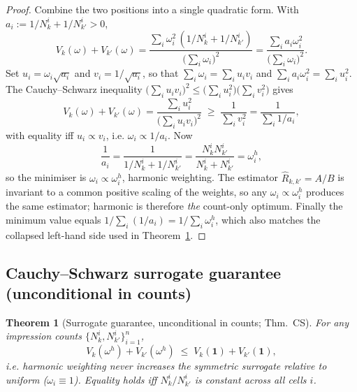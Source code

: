 \documentclass[11pt]{article}
\newtheorem{theorem}{Theorem}
\begin{document}
\begin{proof}
Combine the two positions into a single quadratic form. With
$a_i:=1/N_k^i+1/N_{k'}^i>0$,
\[
V_k(\omega)+V_{k'}(\omega)
=\frac{\sum_i\omega_i^2\,(1/N_k^i+1/N_{k'}^i)}{\bigl(\sum_i\omega_i\bigr)^2}
=\frac{\sum_i a_i\omega_i^2}{\bigl(\sum_i\omega_i\bigr)^2}.
\]
Set $u_i=\omega_i\sqrt{a_i}$ and $v_i=1/\sqrt{a_i}$, so that
$\sum_i\omega_i=\sum_i u_i v_i$ and $\sum_i a_i\omega_i^2=\sum_i u_i^2$.
The Cauchy--Schwarz inequality
$\bigl(\sum_i u_i v_i\bigr)^2\le\bigl(\sum_i u_i^2\bigr)\bigl(\sum_i v_i^2\bigr)$
gives
\[
V_k(\omega)+V_{k'}(\omega)
=\frac{\sum_i u_i^2}{\bigl(\sum_i u_i v_i\bigr)^2}
\;\ge\;\frac{1}{\sum_i v_i^2}
=\frac{1}{\sum_i 1/a_i},
\]
with equality iff $u_i\propto v_i$, i.e. $\omega_i\propto 1/a_i$.
Now
\[
\frac{1}{a_i}=\frac{1}{1/N_k^i+1/N_{k'}^i}
=\frac{N_k^iN_{k'}^i}{N_k^i+N_{k'}^i}=\omega_i^h,
\]
so the minimiser is $\omega_i\propto\omega_i^h$, harmonic weighting.
The estimator $\hat R_{k,k'}=A/B$ is invariant to a common positive
scaling of the weights, so any $\omega_i\propto\omega_i^h$ produces the
same estimator; harmonic is therefore \emph{the} count-only optimum.
Finally the minimum value equals $1/\sum_i(1/a_i)=1/\sum_i\omega_i^h$,
which also matches the collapsed left-hand side used in
Theorem~\ref{sup:thm:cs}.
\end{proof}

\subsection{Cauchy--Schwarz surrogate guarantee (unconditional in counts)}

\begin{theorem}[Surrogate guarantee, unconditional in counts; Thm.~CS]
\label{sup:thm:cs}
For any impression counts $\{N_k^i,N_{k'}^i\}_{i=1}^n$,
\[
V_k(\omega^h)+V_{k'}(\omega^h)\;\le\;V_k(\mathbf 1)+V_{k'}(\mathbf 1),
\]
i.e. harmonic weighting never increases the symmetric surrogate relative
to uniform ($\omega_i\equiv 1$). Equality holds iff $N_k^i/N_{k'}^i$ is
constant across all cells $i$.
\end{theorem}
\end{document}
